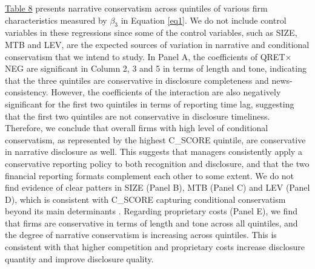 \documentclass[letterpaper,12pt]{article}
\begin{document}
\begin{spacing}{1.5}
\hyperref[T8]{Table 8} presents narrative conservatism across quintiles of various firm characteristics measured by $\beta_3$ in Equation \eqref{eq1}. We do not include control variables in these regressions since some of the control variables, such as SIZE, MTB and LEV, are the expected sources of variation in narrative and conditional conservatism that we intend to study. In Panel A, the coefficients of QRET$\times$NEG are significant in Column 2, 3 and 5 in terms of length and tone, indicating that the three quintiles are conservative in disclosure completeness and news-consistency. However, the coefficients of the interaction are also negatively significant for the first two quintiles in terms of reporting time lag, suggesting that the first two quintiles are not conservative in disclosure timeliness. Therefore, we conclude that overall firms with high level of conditional conservatism, as represented by the highest C\_SCORE quintile, are conservative in narrative disclosure as well. This suggests that managers consistently apply a conservative reporting policy to both recognition and disclosure, and that the two financial reporting formats complement each other to some extent. We do not find evidence of clear patters in SIZE (Panel B), MTB (Panel C) and LEV (Panel D), which is consistent with C\_SCORE capturing conditional conservatism beyond its main determinants \cite{khanEstimationEmpiricalProperties2009}. Regarding proprietary costs (Panel E), we find that firms are conservative in terms of length and tone across all quintiles, and the degree of narrative conservatism is increasing across quintiles. This is consistent with  that higher competition and proprietary costs increase disclosure quantity and improve disclosure quality.  


\end{spacing}
\end{document}
